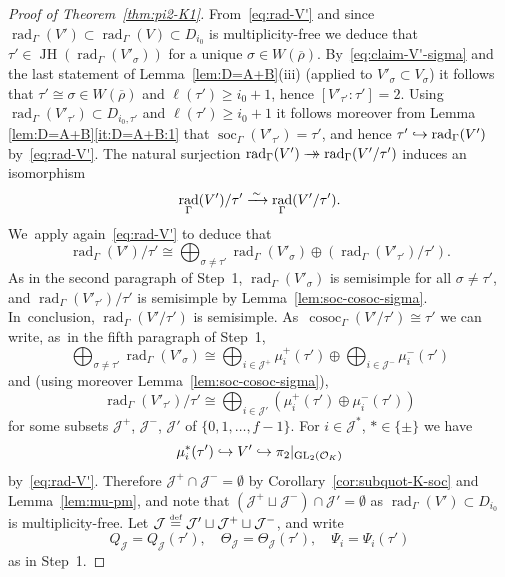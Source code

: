 \documentclass[JEP,XML,SOM,Unicode,NoFloatCountersInSection, NoEqCountersInSection,published]{cedram}
\newcommand\hto{\mathrel{\lhook\joinrel\to}}
\newcommand{\onto}{\mathchoice{\to\hspace*{-5mm}\to}{\mathrel{\hbox{$\to\hspace*{-2.85mm}\to$}}}{\to\hspace*{-3mm}\to}{\to\hspace*{-3mm}\to}}
\newcommand{\defeq}{\stackrel{\textrm{\tiny{\upshape{def}}}}{=}}
\newcommand{\cJ}{{\mathcal{J}}}
\newcommand{\cO}{\mathcal{O}}
\newcommand{\brho}{\overline{\rho}}
\DeclareMathOperator{\cosoc}{cosoc}
\DeclareMathOperator{\GL}{GL}
\DeclareMathOperator{\JH}{\mathrm{JH}}
\DeclareMathOperator{\rad}{rad}
\DeclareMathOperator{\soc}{soc}
\theoremstyle{plain}
\theoremstyle{definition}
\begin{document}
\begin{proof}[Proof of Theorem~\ref{thm:pi2-K1}]
From~\eqref{eq:rad-V'} and since $\rad_{\Gamma}(V') \subset \rad_{\Gamma}(V) \subset D_{i_0}$ is multiplicity-free we deduce that $\tau' \in \JH(\rad_{\Gamma}(V'_\sigma))$ for a unique $\sigma \in W(\brho)$. By~\eqref{eq:claim-V'-sigma} and the last statement of Lemma~\ref{lem:D=A+B}(iii) (applied to $V'_\sigma \subset V_\sigma$) it follows that $\tau' \cong \sigma \in W(\brho)$ and $\ell(\tau') \ge i_0+1$, hence $[V'_{\tau'}:\tau'] = 2$.
Using $\rad_{\Gamma}(V'_{\tau'}) \subset D_{i_0,\tau'}$ and $\ell(\tau') \ge i_0+1$ it follows moreover from Lemma \ref{lem:D=A+B}\eqref{it:D=A+B:1} that $\soc_{\Gamma}(V'_{\tau'}) = \tau'$, and hence $\tau' \hto \rad_{\Gamma}(V')$ by~\eqref{eq:rad-V'}.
The natural surjection $\rad_{\Gamma}(V') \onto \rad_{\Gamma}(V'/\tau')$ induces an isomorphism
\[
\rad_{\Gamma}(V')/\tau' \congto \rad_{\Gamma}(V'/\tau').
\]
We~apply again~\eqref{eq:rad-V'} to deduce that
\begin{equation}\label{eq:rad-V'/tau'}
\rad_{\Gamma}(V')/\tau' \cong \bigoplus_{\sigma \ne \tau'} \rad_{\Gamma}(V'_\sigma) \oplus (\rad_{\Gamma}(V'_{\tau'})/\tau').
\end{equation}
As in the second paragraph of Step~1, $\rad_{\Gamma}(V'_\sigma)$ is semisimple for all $\sigma \ne \tau'$, and $\rad_{\Gamma}(V'_{\tau'})/\tau'$ is semisimple by Lemma~\ref{lem:soc-cosoc-sigma}. In~conclusion, $\rad_{\Gamma}(V'/\tau')$ is semisimple. As~$\cosoc_{\Gamma}(V'/\tau') \cong\tau'$ we can write, as~in the fifth paragraph of Step~1,
\begin{equation}\label{eq:mu-pm-J}
\bigoplus_{\sigma \ne \tau'} \rad_{\Gamma}(V'_\sigma) \cong \bigoplus_{i \in \cJ^+} \mu_i^+(\tau') \oplus \bigoplus_{i \in \cJ^-} \mu_i^-(\tau')
\end{equation}
and (using moreover Lemma~\ref{lem:soc-cosoc-sigma}),
\begin{equation}\label{eq:mu-pm-J'}
\rad_{\Gamma}(V'_{\tau'})/\tau' \cong \bigoplus_{i \in \cJ'} (\mu_i^+(\tau') \oplus \mu_i^-(\tau'))
\end{equation}
for some subsets $\cJ^+$, $\cJ^-$, $\cJ'$ of $\{0,1,\dots,f-1\}$.
For $i \in \cJ^*$, $* \in \{\pm\}$ we have
\[
\mu_i^*(\tau') \hto V' \hto \pi_2|_{\GL_2(\cO_K)}
\]
by~\eqref{eq:rad-V'}.
Therefore $\cJ^+ \cap \cJ^- = \emptyset$ by Corollary~\ref{cor:subquot-K-soc} and Lemma~\ref{lem:mu-pm}, and note that $(\cJ^+ \sqcup \cJ^-) \cap \cJ' = \emptyset$ as $\rad_{\Gamma}(V') \subset D_{i_0}$ is multiplicity-free.
Let $\cJ \defeq \cJ' \sqcup \cJ^+ \sqcup \cJ^-$, and write
\[
Q_\cJ=Q_\cJ(\tau'),\quad\Theta_\cJ=\Theta_\cJ(\tau'),\quad\Psi_i = \Psi_i(\tau')
\]
as in Step~1.


\end{proof}
\end{document}
